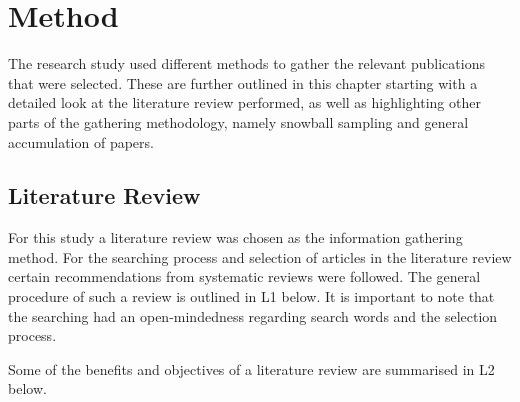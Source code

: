 \chapter{Method}

\minitoc

The research study used different methods to gather the relevant publications that were selected. These are further outlined in this chapter starting with a detailed look at the literature review performed, as well as highlighting other parts of the gathering methodology, namely snowball sampling and general accumulation of papers.

\newpage

\section{Literature Review}


For this study a literature review was chosen as the information gathering method. For the searching process and selection of articles in the literature review certain recommendations from systematic reviews were followed. The general procedure of such a review is outlined in L1 below. It is important to note that the searching had an open-mindedness regarding search words and the selection process.

\vspace{0.5cm}


\vspace{0.5cm}

Some of the benefits and objectives of a literature review are summarised in L2 below.

